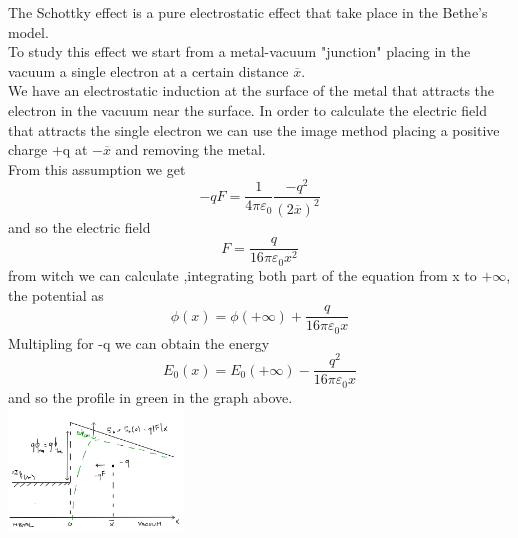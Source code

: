 The Schottky effect is a pure electrostatic effect that take place in the Bethe's model.\\
To study this effect we start from a metal-vacuum "junction" placing in the vacuum a single electron at a certain distance $\overline{x}$.\\
We have an electrostatic induction at the surface of the metal that attracts the electron in the vacuum near the surface. In order to calculate the electric field that attracts the single electron we can use the image method placing a positive charge +q at $-\overline{x}$ and removing the metal.\\
From this assumption we get 
\begin{equation}
-qF=\frac{1}{4\pi \varepsilon_0} \frac{-q^2}{(2\overline{x})^2}
\end{equation}
and so the electric field 
\begin{equation}
F=\frac{q}{16\pi\varepsilon_0x^2}
\end{equation}
from witch we can calculate ,integrating both part of the equation from x to $+\infty$, the potential as
\begin{equation}
\phi(x)=\phi(+\infty)+\frac{q}{16\pi \varepsilon_0 x}
\end{equation}
Multipling for -q we can obtain the energy 
\begin{equation}
E_0(x)=E_0(+\infty)-\frac{q^2}{16 \pi \varepsilon_0 x}
\end{equation}
and so the profile in green in the graph above.\\

\centering
\includegraphics[width=0.35\textwidth]{deltaphibn.png}\\
\raggedright

